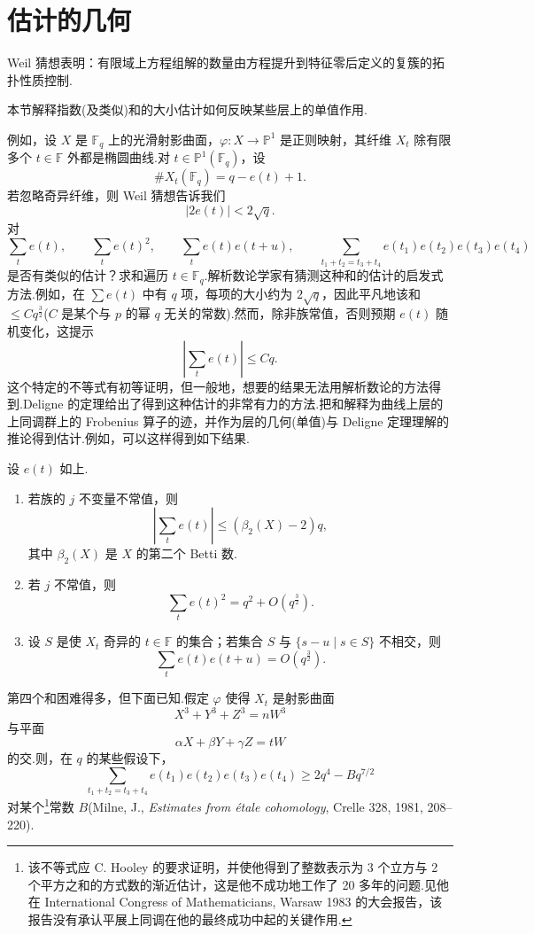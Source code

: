 ﻿%
\chapter{估计的几何}\label{sec:34}

Weil 猜想表明：有限域上方程组解的数量由方程提升到特征零后定义的复簇的拓扑性质控制.

本节解释指数(及类似)和的大小估计如何反映某些层上的单值作用.

例如，设 $X$ 是 $\mathbb{F}_q$ 上的光滑射影曲面，$\varphi \colon X \to \mathbb{P}^{1}$ 是正则映射，其纤维 $X_t$ 除有限多个 $t \in \mathbb{F}$ 外都是椭圆曲线.对 $t \in \mathbb{P}^{1}(\mathbb{F}_q)$，设
\[
\#X_t(\mathbb{F}_q) = q - e(t) + 1.
\]
若忽略奇异纤维，则 Weil 猜想告诉我们
\[
|2e(t)| < 2\sqrt{q}.
\]
对
\[
\sum_{t} e(t), \qquad \sum_{t} e(t)^{2}, \qquad \sum_{t} e(t)e(t+u), \qquad \sum_{t_1 + t_2 = t_3 + t_4} e(t_1)e(t_2)e(t_3)e(t_4)
\]
是否有类似的估计？求和遍历 $t \in \mathbb{F}_q$.解析数论学家有猜测这种和的估计的启发式方法.例如，在 $\sum e(t)$ 中有 $q$ 项，每项的大小约为 $2\sqrt{q}$，因此平凡地该和 $\leq Cq^{\frac{3}{2}}$($C$ 是某个与 $p$ 的幂 $q$ 无关的常数).然而，除非族常值，否则预期 $e(t)$ 随机变化，这提示
\[
\left| \sum_{t} e(t) \right| \leq Cq.
\]
这个特定的不等式有初等证明，但一般地，想要的结果无法用解析数论的方法得到.Deligne 的定理给出了得到这种估计的非常有力的方法.把和解释为曲线上层的上同调群上的 Frobenius 算子的迹，并作为层的几何(单值)与 Deligne 定理理解的推论得到估计.例如，可以这样得到如下结果.

\begin{theorem}\label{thm:34.1}
设 $e(t)$ 如上.
\begin{enumerate}
  \item 若族的 $j$ 不变量不常值，则
  \[
  \left| \sum_{t} e(t) \right| \leq (\beta_2(X) - 2)q,
  \]
  其中 $\beta_2(X)$ 是 $X$ 的第二个 Betti 数.
  \item 若 $j$ 不常值，则
  \[
  \sum_{t} e(t)^{2} = q^{2} + O(q^{\frac{3}{2}}).
  \]
  \item 设 $S$ 是使 $X_t$ 奇异的 $t \in \mathbb{F}$ 的集合；若集合 $S$ 与 $\{s - u \mid s \in S\}$ 不相交，则
  \[
  \sum_{t} e(t)e(t+u) = O(q^{\frac{3}{2}}).
  \]
\end{enumerate}
\end{theorem}

第四个和困难得多，但下面已知.假定 $\varphi$ 使得 $X_t$ 是射影曲面
\[
X^{3} + Y^{3} + Z^{3} = nW^{3}
\]
与平面
\[
\alpha X + \beta Y + \gamma Z = tW
\]
的交.则，在 $q$ 的某些假设下，
\[
\sum_{t_1 + t_2 = t_3 + t_4} e(t_1)e(t_2)e(t_3)e(t_4) \geq 2q^{4} - Bq^{7/2}
\]
对某个\footnote{该不等式应 C. Hooley 的要求证明，并使他得到了整数表示为 3 个立方与 2 个平方之和的方式数的渐近估计，这是他不成功地工作了 20 多年的问题.见他在 International Congress of Mathematicians, Warsaw 1983 的大会报告，该报告没有承认平展上同调在他的最终成功中起的关键作用.}常数 $B$(Milne, J., \emph{Estimates from \'etale cohomology}, Crelle 328, 1981, 208--220).

